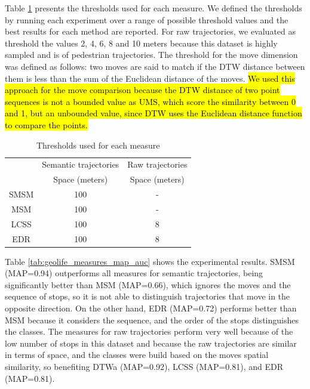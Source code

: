 Table \ref{tab:geolife_thresholds} presents the thresholds used for each measure. We defined the thresholds by running each experiment over a range of possible threshold values and the best results for each method are reported. For raw trajectories, we evaluated as threshold the  values 2, 4, 6, 8 and 10 meters because this dataset is highly sampled and is of pedestrian trajectories. The threshold for the move dimension was defined as follows: two moves are said to match if the DTW distance between them is less than the sum of the Euclidean distance of the moves. \hl{We used this approach for the move comparison because the DTW distance of two point sequences is not a bounded value as UMS, which score the similarity between 0 and 1, but an unbounded value, since DTW uses the Euclidean distance function to compare the points.}

\begin{table}[!h]
\scriptsize
  \centering
  \begin{tabular}{|c|c|c|}
  \hline
  & \multicolumn{1}{c|}{Semantic trajectories} & \multicolumn{1}{c|}{Raw trajectories} \\
 	\cline{2-3}
  & Space (meters) & Space (meters) \\
  \hline
 SMSM & 100 & - \\
 MSM & 100 & - \\
 LCSS & 100 & 8 \\
 EDR & 100 & 8 \\
    \hline
  \end{tabular}
  \caption{Thresholds used for each measure}
  \label{tab:geolife_thresholds}
\end{table}

Table \ref{tab:geolife_measures_map_auc} shows the experimental results.  {SMSM (MAP=0.94) outperforms all measures for semantic trajectories, being significantly better than MSM (MAP=0.66), which ignores the moves and the sequence of stops, so it is not able to distinguish trajectories that move in the opposite direction. On the other hand, EDR (MAP=0.72) performs better than MSM because it considers the sequence, and the order of the stops distinguishes the classes. The measures for raw trajectories perform very well because of the low number of stops in this dataset and because the raw trajectories are similar in terms of space, and the classes were build based on the moves spatial similarity, so benefiting DTWa (MAP=0.92), LCSS (MAP=0.81), and EDR (MAP=0.81). }



